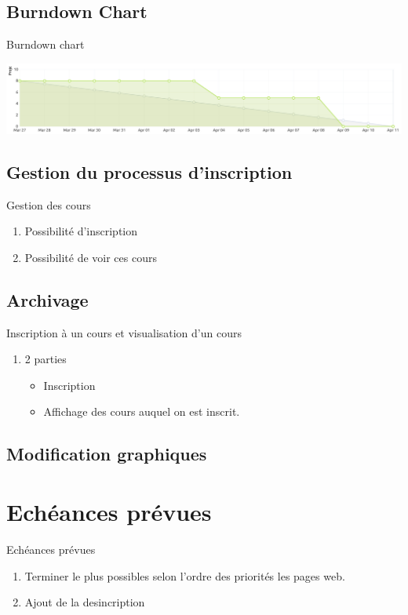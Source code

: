 \documentclass[numbering=fraction]{beamer}
\begin{document}
\subsection{Burndown Chart}
\begin{frame}{Burndown chart}
    \centering
    
    \includegraphics[width=1.1\textwidth]{burndownChart.png} 
\end{frame}

\subsection{Gestion du processus d'inscription}
\begin{frame}{Gestion des cours}
    \begin{enumerate}
        \item Possibilité d'inscription
        \item Possibilité de voir ces cours
    \end{enumerate}
\end{frame}
\subsection{Archivage}
\begin{frame}{Inscription à un cours et visualisation d'un cours}
    \begin{enumerate}
        \item 2 parties
        \begin{itemize}
            \item Inscription
            \item Affichage des cours auquel on est inscrit.
        \end{itemize}
    \end{enumerate}
\end{frame}
\subsection{Modification graphiques}
\section{Echéances prévues}
\begin{frame}{Echéances prévues}
    \begin{enumerate}
        \item Terminer le plus possibles selon l'ordre des priorités les pages web.
        \item Ajout de la desincription    
    \end{enumerate}
\end{frame}
\end{document}
